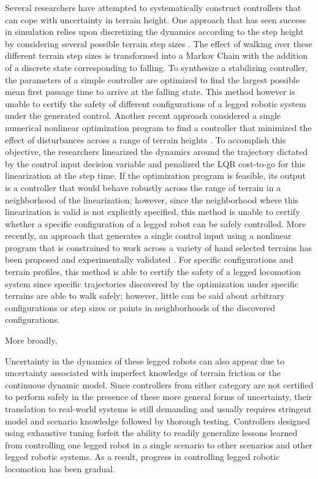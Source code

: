 Several researchers have attempted to systematically construct controllers that can cope with uncertainty in terrain height. 
One approach that has seen success in simulation relies upon discretizing the dynamics according to the step height by considering several possible terrain step sizes \citep{byl2008metastable,saglam2013switching}. 
The effect of walking over these different terrain step sizes is transformed into a Markov Chain with the addition of a discrete state corresponding to falling.
To synthesize a stabilizing controller, the parameters of a simple controller are optimized to find the largest possible mean first passage time to arrive at the falling state. 
This method however is unable to certify the safety of different configurations of a legged robotic system under the generated control. 
Another recent approach considered a single numerical nonlinear optimization program to find a controller that minimized the effect of disturbances across a range of terrain heights \citep{dai2012optimizing}.
To accomplish this objective, the researchers linearized the dynamics around the trajectory dictated by the control input decision variable and penalized the LQR cost-to-go for this linearization at the step time. 
If the optimization program is feasible, its output is a controller that would behave robustly across the range of terrain in a neighborhood of the linearization; however, since the neighborhood where this linearization is valid is not explicitly specified, this method is unable to certify whether a specific configuration of a legged robot can be safely controlled.
More recently, an approach that generates a single control input using a nonlinear program that is constrained to work across a variety of hand selected terrains has been proposed and experimentally validated \citep{griffin2015}. 
For specific configurations and terrain profiles, this method is able to certify the safety of a legged locomotion system since specific trajectories discovered by the optimization under specific terrains are able to walk safely; however, little can be said about arbitrary configurations or step sizes or points in neighborhoods of the discovered configurations. 

More broadly, 

\vspace{1mm}
Uncertainty in the dynamics of these legged robots can also appear due to uncertainty associated with imperfect knowledge of terrain friction or the continuous dynamic model. 
Since controllers from either category are not certified to perform safely in the presence of these more general forms of uncertainty, their translation to real-world systems is still demanding and usually requires stringent model and scenario knowledge followed by thorough testing. 
Controllers designed using exhaustive tuning forfeit the ability to readily generalize lessons learned from controlling one legged robot in a single scenario to other scenarios and other legged robotic systems.
As a result, progress in controlling legged robotic locomotion has been gradual.

